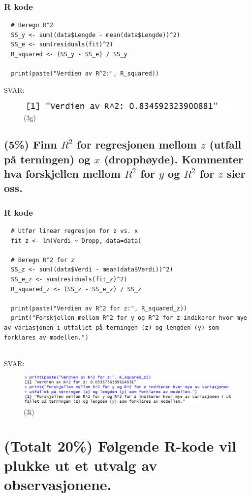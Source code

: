 \documentclass[12pt]{article}
\begin{document}
\subsubsection{R kode}
\begin{verbatim}
  # Beregn R^2
  SS_y <- sum((data$Lengde - mean(data$Lengde))^2)
  SS_e <- sum(residuals(fit)^2)
  R_squared <- (SS_y - SS_e) / SS_y
  
  print(paste("Verdien av R^2:", R_squared)) 
\end{verbatim}
SVAR:
\begin{figure}[H]
  \centering
  \includegraphics[width=1\textwidth]{3g.png}
  \caption{(3g)}
\end{figure}


\subsection{(5\%) Finn $R^2$ for regresjonen mellom $z$ (utfall på terningen) og $x$ (dropphøyde). Kommenter hva forskjellen mellom $R^2$ for $y$ og $R^2$ for $z$ sier oss.}
\subsubsection{R kode}
\begin{verbatim}
  # Utfør lineær regresjon for z vs. x
  fit_z <- lm(Verdi ~ Dropp, data=data)
  
  # Beregn R^2 for z
  SS_z <- sum((data$Verdi - mean(data$Verdi))^2)
  SS_e_z <- sum(residuals(fit_z)^2)
  R_squared_z <- (SS_z - SS_e_z) / SS_z
  
  print(paste("Verdien av R^2 for z:", R_squared_z))
  print("Forskjellen mellom R^2 for y og R^2 for z indikerer hvor mye av variasjonen i utfallet på terningen (z) og lengden (y) som forklares av modellen.")
  
\end{verbatim}
SVAR:
\begin{figure}[H]
  \centering
  \includegraphics[width=1\textwidth]{3i.png}
  \caption{(3i)}
\end{figure}


\section{(Totalt 20\%) Følgende R-kode vil plukke ut et utvalg av observasjonene.}
\end{document}
